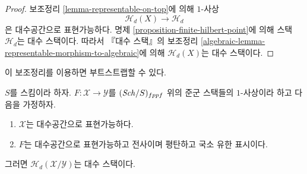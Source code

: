 \begin{proof}
보조정리 \ref{lemma-representable-on-top}에 의해 $1$-사상
$$
\mathcal{H}_d(X) \longrightarrow \mathcal{H}_d
$$
은 대수공간으로 표현가능하다. 명제
\ref{proposition-finite-hilbert-point}에 의해 스택 $\mathcal{H}_d$는
대수 스택이다. 따라서 『대수 스택』의 보조정리
\ref{algebraic-lemma-representable-morphism-to-algebraic}에 의해
$\mathcal{H}_d(X)$는 대수 스택이다.
\end{proof}

\noindent
이 보조정리를 이용하면 부트스트랩할 수 있다.

\begin{lemma}
\label{lemma-hilbert-stack-relative-space}
$S$를 스킴이라 하자. $F : \mathcal{X} \to \mathcal{Y}$를
$(\mathit{Sch}/S)_{fppf}$ 위의 준군 스택들의 $1$-사상이라 하고 다음을 가정하자.
\begin{enumerate}
\item $\mathcal{X}$는 대수공간으로 표현가능하다.
\item $F$는 대수공간으로 표현가능하고 전사이며 평탄하고
국소 유한 표시이다.
\end{enumerate}
그러면 $\mathcal{H}_d(\mathcal{X}/\mathcal{Y})$는 대수 스택이다.
\end{lemma}

